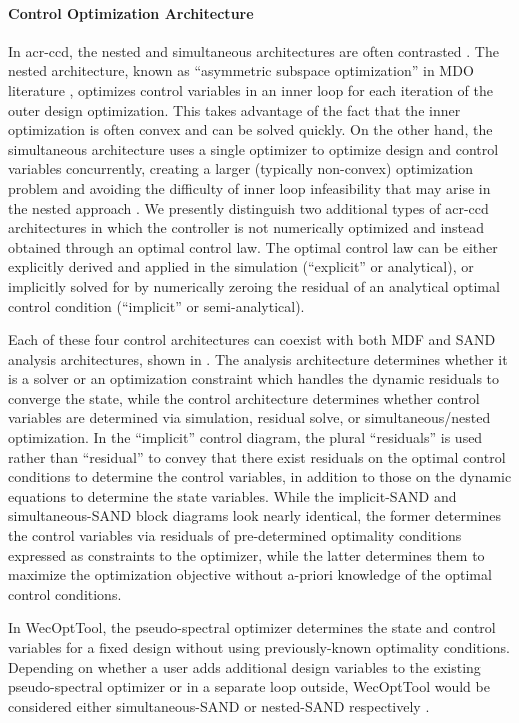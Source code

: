 \paragraph{Control Optimization Architecture}
In \gls{acr-ccd}, the nested and simultaneous architectures are often contrasted \citep{sundarrajan_towards_2021,herber_nested_2018}.
The nested architecture, known as ``asymmetric subspace optimization'' in MDO literature \citep{chittick_asymmetric_2009}, optimizes control variables in an inner loop for each iteration of the outer design optimization.
This takes advantage of the fact that the inner optimization is often convex and can be solved quickly.
On the other hand, the simultaneous architecture uses a single optimizer to optimize design and control variables concurrently, creating a larger (typically non-convex) optimization problem and avoiding the difficulty of inner loop infeasibility that may arise in the nested approach \citep{herber_nested_2018}. 
We presently distinguish two additional types of \gls{acr-ccd} architectures in which the controller is not numerically optimized and instead obtained through an optimal control law.
The optimal control law can be either explicitly derived and applied in the simulation (``explicit'' or analytical), or implicitly solved for by numerically zeroing the residual of an analytical optimal control condition (``implicit'' or semi-analytical).

Each of these four control architectures can coexist with both MDF and SAND analysis architectures, shown in .
The analysis architecture determines whether it is a solver or an optimization constraint which handles the dynamic residuals to converge the state, while the control architecture determines whether control variables are determined via simulation, residual solve, or simultaneous/nested optimization.
In the ``implicit'' control diagram, the plural ``residuals'' is used rather than ``residual'' to convey that there exist residuals on the optimal control conditions to determine the control variables, in addition to those on the dynamic equations to determine the state variables.
While the implicit-SAND and simultaneous-SAND block diagrams look nearly identical, the former determines the control variables via residuals of pre-determined optimality conditions expressed as constraints to the optimizer, while the latter determines them to maximize the optimization objective without a-priori knowledge of the optimal control conditions.

In WecOptTool, the pseudo-spectral optimizer determines the state and control variables for a fixed design without using previously-known optimality conditions.
Depending on whether a user adds additional design variables to the existing pseudo-spectral optimizer or in a separate loop outside, WecOptTool would be considered either simultaneous-SAND or nested-SAND respectively \citep{coe_initial_2020}.

